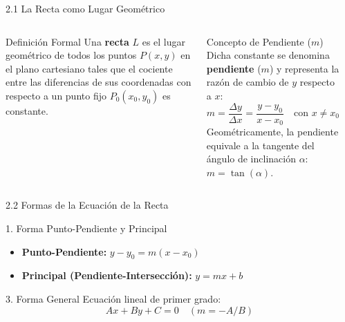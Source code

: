 \documentclass[10pt,aspectratio=169,spanish]{beamer}
\begin{document}
\begin{frame}{2.1 La Recta como Lugar Geométrico}
\begin{columns}
  \begin{block}{Definición Formal}
  Una \textbf{recta} $L$ es el lugar geométrico de todos los puntos $P(x, y)$ en el plano cartesiano tales que el cociente entre las diferencias de sus coordenadas con respecto a un punto fijo $P_0(x_0, y_0)$ es constante.
  \end{block}

  \begin{block}{Concepto de Pendiente ($m$)}
  Dicha constante se denomina \textbf{pendiente} ($m$) y representa la razón de cambio de $y$ respecto a $x$:
  \[
    m = \frac{\Delta y}{\Delta x} = \frac{y - y_0}{x - x_0} \quad \text{con } x \neq x_0
  \]
  Geométricamente, la pendiente equivale a la tangente del ángulo de inclinación $\alpha$: $m = \tan(\alpha)$.
  \end{block}

  \begin{center}
  \end{center}
\end{columns}
\end{frame}


\begin{frame}{2.2 Formas de la Ecuación de la Recta}

  \begin{block}{1. Forma Punto-Pendiente y Principal}
  \begin{itemize}
    \item \textbf{Punto-Pendiente:} $y - y_0 = m(x - x_0)$
    \item \textbf{Principal (Pendiente-Intersección):} $y = mx + b$
  \end{itemize}
  \end{block}


  \begin{block}{3. Forma General}
  Ecuación lineal de primer grado:
  \[
    Ax + By + C = 0 \quad (m = -A/B)
  \]
  \end{block}

\end{frame}
\end{document}
